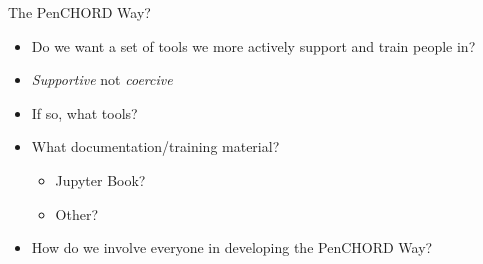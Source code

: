 \documentclass[xcolor={usenames,dvipsnames}]{beamer}
\begin{document}
\begin{frame}{The PenCHORD Way?}

\begin{itemize}
    \setlength\itemsep{3mm}
    \item Do we want a set of tools we more actively support and train people in?
    \item \emph{Supportive} not \emph{coercive}
    \item If so, what tools?
    \item What documentation/training material?
    \begin{itemize}
        \item Jupyter Book?
        \item Other?
    \end{itemize}
    \item How do we involve everyone in developing the PenCHORD Way?
\end{itemize}

\end{frame}
\end{document}
